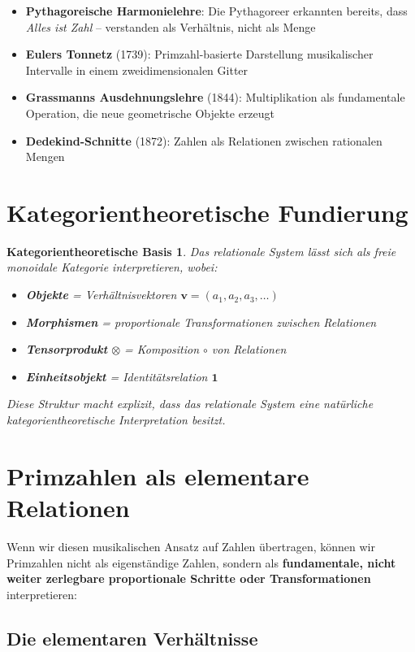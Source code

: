 \documentclass[11pt,a4paper]{article}
\newcommand{\primrel}[1]{\mathbf{#1}}
\newcommand{\vect}[1]{\boldsymbol{#1}}
\newtheorem{category}{Kategorientheoretische Basis}[section]
\begin{document}
	\begin{itemize}
		\item \textbf{Pythagoreische Harmonielehre}: Die Pythagoreer erkannten bereits, dass \emph{Alles ist Zahl} -- verstanden als Verhältnis, nicht als Menge
		\item \textbf{Eulers Tonnetz} (1739): Primzahl-basierte Darstellung musikalischer Intervalle in einem zweidimensionalen Gitter
		\item \textbf{Grassmanns Ausdehnungslehre} (1844): Multiplikation als fundamentale Operation, die neue geometrische Objekte erzeugt
		\item \textbf{Dedekind-Schnitte} (1872): Zahlen als Relationen zwischen rationalen Mengen
	\end{itemize}
	
	\section{Kategorientheoretische Fundierung}
	
	\begin{category}
		Das relationale System lässt sich als freie monoidale Kategorie interpretieren, wobei:
		\begin{itemize}
			\item \textbf{Objekte} = Verhältnisvektoren $\vect{v} = (a_1, a_2, a_3, \ldots)$
			\item \textbf{Morphismen} = proportionale Transformationen zwischen Relationen
			\item \textbf{Tensorprodukt} $\otimes$ = Komposition $\circ$ von Relationen
			\item \textbf{Einheitsobjekt} = Identitätsrelation $\primrel{1}$
		\end{itemize}
		
		Diese Struktur macht explizit, dass das relationale System eine natürliche kategorientheoretische Interpretation besitzt.
	\end{category}
	
	\section{Primzahlen als elementare Relationen}
	
	Wenn wir diesen musikalischen Ansatz auf Zahlen übertragen, können wir Primzahlen nicht als eigenständige Zahlen, sondern als \textbf{fundamentale, nicht weiter zerlegbare proportionale Schritte oder Transformationen} interpretieren:
	
	\subsection{Die elementaren Verhältnisse}
	
\end{document}
